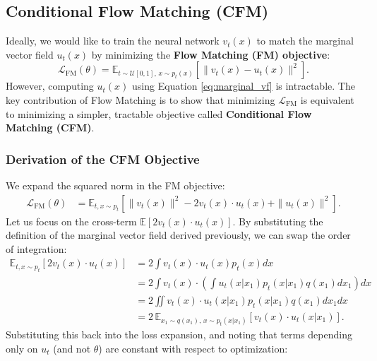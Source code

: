 \documentclass{article}
\begin{document}
\subsection{Conditional Flow Matching (CFM)}

Ideally, we would like to train the neural network $v_t(x)$ to match the marginal vector field $u_t(x)$ by minimizing the \textbf{Flow Matching (FM) objective}:
\begin{equation}
    \mathcal{L}_{\text{FM}}(\theta) = \mathbb{E}_{t \sim \mathcal{U}[0,1], \, x\sim p_t(x)} \left[ \| v_t(x)-u_t(x) \|^2 \right].
\end{equation}
However, computing $u_t(x)$ using Equation \ref{eq:marginal_vf} is intractable. The key contribution of Flow Matching is to show that minimizing $\mathcal{L}_{\text{FM}}$ is equivalent to minimizing a simpler, tractable objective called \textbf{Conditional Flow Matching (CFM)}.

\subsubsection{Derivation of the CFM Objective}
We expand the squared norm in the FM objective:
\begin{align}
    \mathcal{L}_{\text{FM}}(\theta) &= \mathbb{E}_{t, x \sim p_t} \left[ \|v_t(x)\|^2 - 2 v_t(x) \cdot u_t(x) + \|u_t(x)\|^2 \right].
\end{align}
Let us focus on the cross-term $\mathbb{E}[2 v_t(x) \cdot u_t(x)]$. By substituting the definition of the marginal vector field derived previously, we can swap the order of integration:
\begin{align}
    \mathbb{E}_{t, x\sim p_t} [ 2 v_t(x) \cdot u_t(x) ] &= 2 \int v_t(x) \cdot u_t(x) p_t(x) dx \\
    &= 2 \int v_t(x) \cdot \left( \int u_t(x|x_1) p_t(x|x_1) q(x_1) dx_1 \right) dx \\
    &= 2 \iint v_t(x) \cdot u_t(x|x_1) p_t(x|x_1) q(x_1) dx_1 dx \\
    &= 2 \, \mathbb{E}_{x_1 \sim q(x_1), \, x \sim p_t(x|x_1)} \left[ v_t(x) \cdot u_t(x|x_1) \right].
\end{align}
Substituting this back into the loss expansion, and noting that terms depending only on $u_t$ (and not $\theta$) are constant with respect to optimization:
\end{document}
